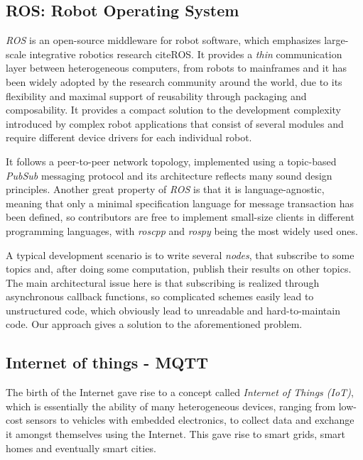 \documentclass[sigplan,review,anonymous]{acmart}
\begin{document}

\subsection{ROS: Robot Operating System}

\textit{ROS} is an open-source middleware for robot software, which emphasizes
large-scale integrative robotics research cite{ROS}. It provides a \textit{thin}
communication layer between heterogeneous computers, from robots to mainframes
and it has been widely adopted by the research community around the world, due
to its flexibility and maximal support of reusability through packaging and
composability. It provides a compact solution to the development complexity
introduced by complex robot applications that consist of several modules and
require different device drivers for each individual robot.

It follows a peer-to-peer network topology, implemented using a topic-based
\textit{PubSub} messaging protocol and its architecture reflects many sound
design principles. Another great property of \textit{ROS} is that it is
language-agnostic, meaning that only a minimal specification language for
message transaction has been defined, so contributors are free to implement
small-size clients in different programming languages, with \textit{roscpp} and
\textit{rospy} being the most widely used ones.

A typical development scenario is to write several \textit{nodes}, that
subscribe to some topics and, after doing some computation, publish their
results on other topics. The main architectural issue here is that subscribing
is realized through asynchronous callback functions, so complicated schemes
easily lead to unstructured code, which obviously lead to unreadable and
hard-to-maintain code. Our approach gives a solution to the aforementioned
problem.

\subsection{Internet of things - MQTT}

The birth of the Internet gave rise to a concept called \textit{Internet of
Things (IoT)}, which is essentially the ability of many heterogeneous devices,
ranging from low-cost sensors to vehicles with embedded electronics, to collect
data and exchange it amongst themselves using the Internet. This gave rise to
smart grids, smart homes and eventually smart cities.
\end{document}
